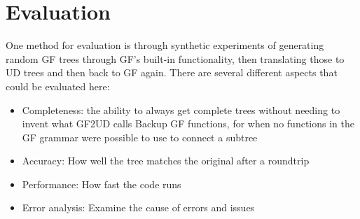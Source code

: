 \documentclass{article}
\begin{document}

\section{Evaluation}
One method for evaluation is through synthetic experiments of generating random GF trees through GF's built-in functionality, then translating those to UD trees and then back to GF again. There are several different aspects that could be evaluated here:
\begin{itemize}
    \item Completeness: the ability to always get complete trees without needing to invent what GF2UD calls Backup GF functions, for when no functions in the GF grammar were possible to use to connect a subtree
    \item Accuracy: How well the tree matches the original after a roundtrip
    \item Performance: How fast the code runs
    \item Error analysis: Examine the cause of errors and issues
\end{itemize}
\end{document}
